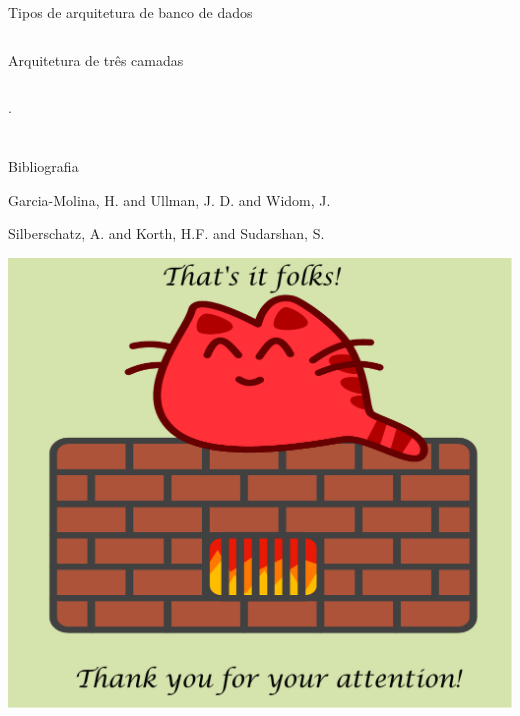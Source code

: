 \documentclass[xcolor=x11names,compress]{beamer}
\begin{document}
\begin{frame}{Tipos de arquitetura de banco de dados}
\begin{center}
\begin{columns}[T]
\begin{column}{.5\textwidth}
\centering Arquitetura de três camadas
\end{column}

\end{columns}
\end{center}

.
\end{frame}

\section{}

\begin{frame}{Bibliografia}

\begin{thebibliography}{Garcia-MolinaEtAl, 2008}


Garcia-Molina, H. and Ullman, J. D. and Widom, J.



Silberschatz, A. and Korth, H.F. and Sudarshan, S.


\end{thebibliography}


\end{frame}
\begin{frame}

\begin{center}
\includegraphics[keepaspectratio, width=.8\textwidth]{happycat-end}
\end{center}
\end{frame}
\end{document}
